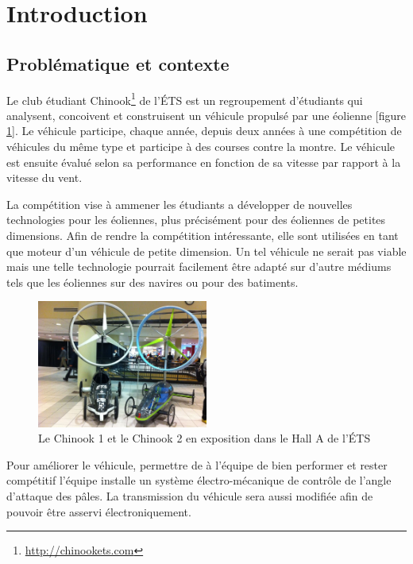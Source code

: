 \section{Introduction} %
\label{sec:Introduction}

\subsection{Problématique et contexte} %
\label{sub:prob_contexte}

Le club étudiant Chinook\footnote{\url{http://chinookets.com}} de l'ÉTS est un regroupement d'étudiants qui analysent, concoivent et construisent un véhicule propulsé par une éolienne [figure \ref{fig:chinookHall}]. Le véhicule participe, chaque année, depuis deux années à une compétition de véhicules du même type et participe à des courses contre la montre. Le véhicule est ensuite évalué selon sa performance en fonction de sa vitesse par rapport à la vitesse du vent.

La compétition vise à ammener les étudiants a développer de nouvelles technologies pour les éoliennes, plus précisément pour des éoliennes de petites dimensions. Afin de rendre la compétition intéressante, elle sont utilisées en tant que moteur d'un véhicule de petite dimension. Un tel véhicule ne serait pas viable mais une telle technologie pourrait facilement être adapté sur d'autre médiums tels que les éoliennes sur des navires ou pour des batiments.

\begin{figure}[H]
  \centering
  \includegraphics[width=0.5\textwidth]{images/chinook_1_2.jpg}
  \caption[Chinook 1 et 2]{Le Chinook 1 et le Chinook 2 en exposition dans le Hall A de l'ÉTS}
  \label{fig:chinookHall}
\end{figure}

Pour améliorer le véhicule, permettre de à l'équipe de bien performer et rester compétitif l'équipe installe un système électro-mécanique de contrôle de l'angle d'attaque des pâles. La transmission du véhicule sera aussi modifiée afin de pouvoir être asservi électroniquement.

